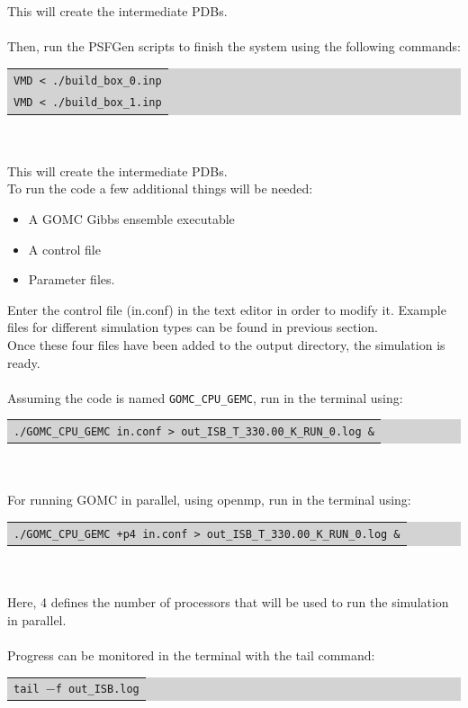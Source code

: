 This will create the intermediate PDBs.\\\\
Then, run the PSFGen scripts to finish the system using the following commands:\\
\colorbox{lightgray}{
\begin{tabular}{l}
\texttt{VMD < ./build\_box\_0.inp}\\
\texttt{VMD < ./build\_box\_1.inp}\\
\end{tabular}}\\\\
This will create the intermediate PDBs.\\
To run the code a few additional things will be needed:
\begin{itemize}
\item A GOMC Gibbs ensemble executable
\item A control file
\item Parameter files.
\end{itemize}
Enter the control file (in.conf) in the text editor in order to modify it. Example files for different simulation types can be found in previous section. \\
Once these four files have been added to the output directory, the simulation is ready.\\\\
Assuming the code is named \texttt{GOMC\_CPU\_GEMC}, run in the terminal using:\\
\colorbox{lightgray}{
\begin{tabular}{l}
\texttt{./GOMC\_CPU\_GEMC in.conf > out\_ISB\_T\_330.00\_K\_RUN\_0.log \&}
\end{tabular}}\\\\
For running GOMC in parallel, using openmp, run in the terminal using:\\
\colorbox{lightgray}{
\begin{tabular}{l}
\texttt{./GOMC\_CPU\_GEMC +p4 in.conf > out\_ISB\_T\_330.00\_K\_RUN\_0.log \&}
\end{tabular}}\\\\
Here, 4 defines the number of processors that will be used to run the simulation in parallel.\\\\
Progress can be monitored in the terminal with the tail command:\\
\colorbox{lightgray}{
\begin{tabular}{l}
\texttt{tail $-$f out\_ISB.log}
\end{tabular}}\\\\
